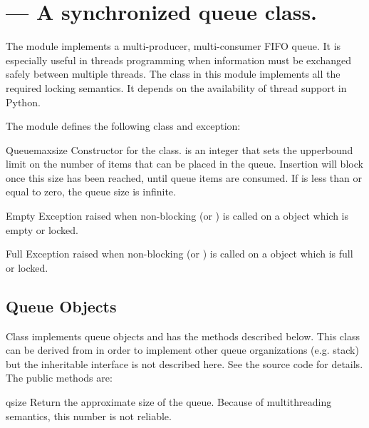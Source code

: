 \section{ ---
         A synchronized queue class.}




The  module implements a multi-producer, multi-consumer
FIFO queue.  It is especially useful in threads programming when
information must be exchanged safely between multiple threads.  The
 class in this module implements all the required locking
semantics.  It depends on the availability of thread support in
Python.

The  module defines the following class and exception:


\begin{classdesc}{Queue}{maxsize}
Constructor for the class.   is an integer that sets the
upperbound limit on the number of items that can be placed in the
queue.  Insertion will block once this size has been reached, until
queue items are consumed.  If  is less than or equal to
zero, the queue size is infinite.
\end{classdesc}

\begin{excdesc}{Empty}
Exception raised when non-blocking  (or
) is called on a  object which is
empty or locked.
\end{excdesc}

\begin{excdesc}{Full}
Exception raised when non-blocking  (or
) is called on a  object which is
full or locked.
\end{excdesc}

\subsection{Queue Objects}
\label{QueueObjects}

Class  implements queue objects and has the methods
described below.  This class can be derived from in order to implement
other queue organizations (e.g. stack) but the inheritable interface
is not described here.  See the source code for details.  The public
methods are:

\begin{methoddesc}{qsize}{}
Return the approximate size of the queue.  Because of multithreading
semantics, this number is not reliable.
\end{methoddesc}

